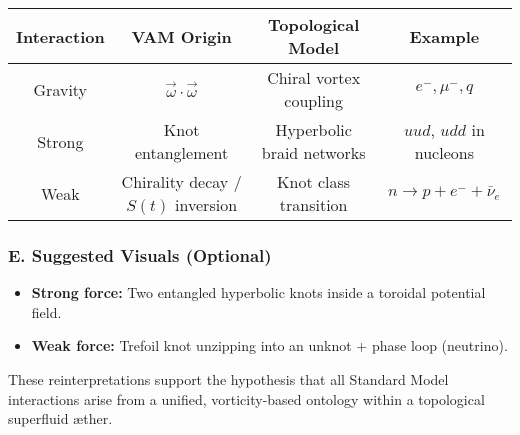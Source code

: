\begin{center}
\begin{tabular}{|c|c|c|c|}
\hline
\textbf{Interaction} & \textbf{VAM Origin} & \textbf{Topological Model} & \textbf{Example} \\\hline
Gravity & $\vec{\omega} \cdot \vec{\omega}$ & Chiral vortex coupling & $e^-, \mu^-, q$ \\\hline
Strong  & Knot entanglement & Hyperbolic braid networks & $uud$, $udd$ in nucleons \\\hline
Weak    & Chirality decay / $S(t)$ inversion & Knot class transition & $n \rightarrow p + e^- + \bar{\nu}_e$ \\\hline
\end{tabular}
\end{center}

\subsubsection*{E. Suggested Visuals (Optional)}

\begin{itemize}
    \item \textbf{Strong force:} Two entangled hyperbolic knots inside a toroidal potential field.
    \item \textbf{Weak force:} Trefoil knot unzipping into an unknot + phase loop (neutrino).
\end{itemize}

\bigskip

These reinterpretations support the hypothesis that all Standard Model interactions arise from a unified, vorticity-based ontology within a topological superfluid æther.




